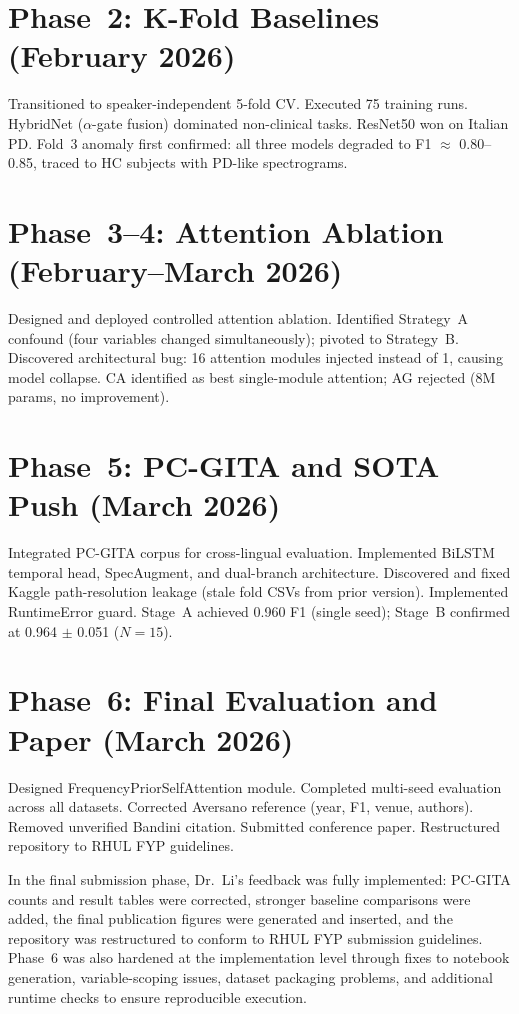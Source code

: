 \documentclass[oneside,openany]{final_report}
\begin{document}
\section{Phase~2: K-Fold Baselines (February 2026)}
Transitioned to speaker-independent 5-fold CV. Executed 75 training runs. HybridNet ($\alpha$-gate fusion) dominated non-clinical tasks. ResNet50 won on Italian PD. Fold~3 anomaly first confirmed: all three models degraded to F1 $\approx$ 0.80--0.85, traced to HC subjects with PD-like spectrograms.

\section{Phase~3--4: Attention Ablation (February--March 2026)}
Designed and deployed controlled attention ablation. Identified Strategy~A confound (four variables changed simultaneously); pivoted to Strategy~B. Discovered architectural bug: 16 attention modules injected instead of 1, causing model collapse. CA identified as best single-module attention; AG rejected (8M params, no improvement).

\section{Phase~5: PC-GITA and SOTA Push (March 2026)}
Integrated PC-GITA corpus for cross-lingual evaluation. Implemented BiLSTM temporal head, SpecAugment, and dual-branch architecture. Discovered and fixed Kaggle path-resolution leakage (stale fold CSVs from prior version). Implemented RuntimeError guard. Stage~A achieved 0.960 F1 (single seed); Stage~B confirmed at 0.964 $\pm$ 0.051 ($N\!=\!15$).

\section{Phase~6: Final Evaluation and Paper (March 2026)}
Designed FrequencyPriorSelfAttention module. Completed multi-seed evaluation across all datasets. Corrected Aversano reference (year, F1, venue, authors). Removed unverified Bandini citation. Submitted conference paper. Restructured repository to RHUL FYP guidelines.

In the final submission phase, Dr.\ Li's feedback was fully implemented: PC-GITA counts and result tables were corrected, stronger baseline comparisons were added, the final publication figures were generated and inserted, and the repository was restructured to conform to RHUL FYP submission guidelines. Phase~6 was also hardened at the implementation level through fixes to notebook generation, variable-scoping issues, dataset packaging problems, and additional runtime checks to ensure reproducible execution.
\end{document}
